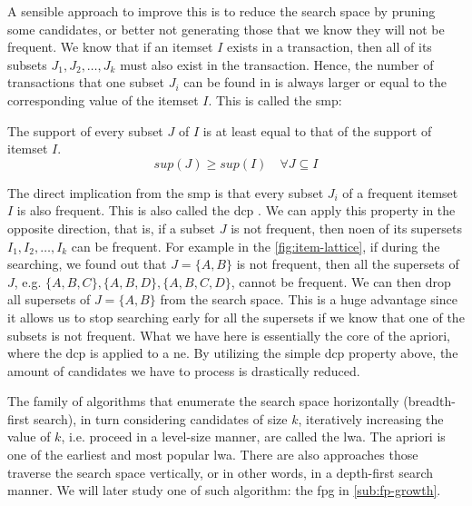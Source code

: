 A sensible approach to improve this is to reduce the search space by pruning some candidates, or better not generating those that we know they will not be frequent.
We know that if an itemset $I$ exists in a transaction, then all of its subsets $J_1, J_2, \dots, J_k$ must also exist in the transaction.
Hence, the number of transactions that one subset $J_i$ can be found in is always larger or equal to the corresponding value of the itemset $I$.
This is called the \acl{smp}:
\begin{definition}
    The support of every subset $J$ of $I$ is at least equal to that of the support of itemset $I$.
    \begin{equation}
        sup(J) \geq sup(I) \quad \forall J \subseteq I
    \end{equation}
\end{definition}

The direct implication from the \acl{smp} is that every subset $J_i$ of a frequent itemset $I$ is also frequent.
This is also called the \acl{dcp} \citep{Aggarwal15}.
We can apply this property in the opposite direction, that is, if a subset $J$ is not frequent, then noen of its supersets $I_1, I_2, \dots, I_k$ can be frequent.
For example in the \autoref{fig:item-lattice}, if during the searching, we found out that $J = \{A, B\}$ is not frequent, then all the supersets of $J$, e.g. $\{A, B, C\}, \{A, B , D\}, \{A, B , C, D\}$, cannot be frequent.
We can then drop all supersets of ${J = \{A, B\}}$ from the search space.
This is a huge advantage since it allows us to stop searching early for all the supersets if we know that one of the subsets is not frequent.
What we have here is essentially the core of the \acl{apriori}, where the \acl{dcp} is applied to a \ac{ne}.
By utilizing the simple \acl{dcp} property above, the amount of candidates we have to process is drastically reduced.


The family of algorithms that enumerate the search space horizontally (breadth-first search), in turn considering candidates of size $k$, iteratively increasing the value of $k$, i.e. proceed in a level-size manner, are called the \acl{lwa}.
The \acl{apriori} is one of the earliest and most popular \acl{lwa}.
There are also approaches those traverse the search space vertically, or in other words, in a depth-first search manner.
We will later study one of such algorithm: the \acl{fpg} in \autoref{sub:fp-growth}.

